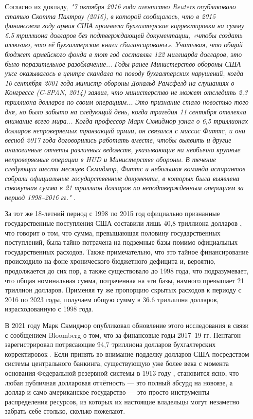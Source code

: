\documentclass[10pt,twocolumn,letterpaper]{article}
\begin{document}
Согласно их докладу, \textit{"7 октября 2016 года агентство Reuters опубликовало статью Скотта Палтроу (2016), в которой сообщалось, что в 2015 финансовом году армия США произвела бухгалтерские корректировки на сумму 6.5 триллиона долларов без подтверждающей документации, «чтобы создать иллюзию, что её бухгалтерские книги сбалансированы». Учитывая, что общий бюджет армейского фонда в тот год составлял 122 миллиарда долларов, это было поразительное разоблачение... Годы ранее Министерство обороны США уже оказывалось в центре скандала по поводу бухгалтерских нарушений, когда 10 сентября 2001 года министр обороны Дональд Рамсфелд на слушаниях в Конгрессе (C-SPAN, 2014) заявил, что министерство не может отследить 2,3 триллиона долларов по своим операциям... Это признание стало новостью того дня, но было забыто на следующий день, когда трагедия 11 сентября отвлекла внимание всего мира... Когда профессор Марк Скмидмор узнал о 6,5 триллионах долларов непроверяемых транзакций армии, он связался с миссис Фиттс, и они весной 2017 года договорились работать вместе, чтобы выявить и другие аналогичные отчеты различных ведомств, указывающие на необычно крупные непроверяемые операции в HUD и Министерстве обороны. В течение следующих шести месяцев Скмидмор, Фиттс и небольшая команда аспирантов собрали официальные государственные документы, в которых была выявлена совокупная сумма в 21 триллион долларов по неподтвержденным операциям за период 1998–2016 гг."} \cite{12}.

За тот же 18-летний период с 1998 по 2015 год официально признанные государственные поступления США составили лишь 40,8 триллиона долларов \cite{15}, что говорит о том, что сумма, превышающая половину государственных поступлений, была тайно потрачена на подземные базы помимо официальных государственных расходов. Также примечательно, что это тайное финансирование происходило на фоне хронического бюджетного дефицита и, вероятно, продолжается до сих пор, а также существовало до 1998 года, что подразумевает, что общая номинальная сумма, потраченная на эти базы, намного превышает 21 триллион долларов. Применяя ту же пропорцию скрытых расходов к периоду с 2016 по 2023 годы, получаем общую сумму в 36.6 триллиона долларов, израсходованную с 1998 года.

В 2021 году Марк Скмидмор опубликовал обновление этого исследования в связи с сообщением Bloomberg о том, что за финансовые годы 2017–19 гг. Пентагон зарегистрировал потрясающие 94,7 триллиона долларов бухгалтерских корректировок \cite{17,18}. Если принять во внимание подделку долларов США посредством системы центрального банкинга, существующую уже более века с момента основания Федеральной резервной системы в 1913 году \cite{37}, становится ясно, что любая публичная долларовая отчётность — это полный абсурд на новоязе, а доллар и само американское государство — это просто инструменты распределения ресурсов, из которых их настоящие владельцы могут незаметно забрать себе столько, сколько пожелают.
\end{document}
